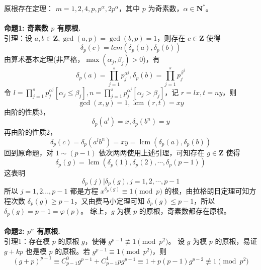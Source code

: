 \documentclass[12pt,a4paper]{article}
\begin{document}
原根存在定理： $m=1,2,4,p,p^\alpha,2p^\alpha$，其中 $p$ 为奇素数，$\alpha\in\mathbf{N^*}$。\\\\
\textbf{命题1: 奇素数 $p$ 有原根.}
\\引理：设 $a, b\in\mathbf{Z},\gcd(a,p)=\gcd(b,p)=1$，则存在 $c\in\mathbf{Z}$ 使得 \begin{equation*}
	\delta_p(c)=lcm(\delta_p(a),\delta_p(b))
\end{equation*}
由算术基本定理(非严格，$\max(\alpha_j,\beta_j)>0$)，有 
\begin{equation*}
	\displaystyle \delta_p(a)=\prod_{j=1}^{s}p_j^{\alpha^{j}},\delta_p(b)=\prod_{j=1}^{s}p_j^{\beta^{j}}
\end{equation*}
令 $\displaystyle l=\prod_{j=1}^{s}p_j^{\alpha^{j}}[\alpha_j\le\beta_j],n=\prod_{j=1}^{s}p_j^{\alpha^{j}}[\alpha_j>\beta_j]$，记 $r=lx,t=ny$，则 \begin{equation*}
	\gcd(x,y)=1,\operatorname{lcm}(r,t)=xy
\end{equation*}
由阶的性质3，\begin{equation*}
	\displaystyle\delta_p(a^l)=x,\delta_p(b^n)=y
\end{equation*}
再由阶的性质2，
\begin{equation*}
	\displaystyle\delta_p(c)=\delta_p(a^lb^n)=xy=\operatorname{lcm}(\delta_p(a),\delta_p(b))
\end{equation*}
回到原命题，对 $1\sim(p-1)$ 依次两两使用上述引理，可知存在 $g\in\mathbf{Z}$ 使得 
\begin{equation*}
	\delta_p(g)=\operatorname{lcm}\left(\delta_p(1),\delta_p(2),\cdots,\delta_p(p-1)\right)
\end{equation*}
这表明 
\begin{equation*}\delta_p(j)|\delta_p(g),j=1,2,\cdots,p-1\end{equation*}
所以 $j=1,2...,p-1$ 都是方程 $x^{\delta_p(g)}\equiv1\pmod p$ 的根，由拉格朗日定理可知方程次数 $\delta_p(g)\ge p-1$，又由费马小定理可知 $\delta_p(g)\le p-1$，所以 $\delta_p(g)=p-1=\varphi(p)$。
综上，$g$ 为模 $p$ 的原根，奇素数都存在原根。
\\
\\
\textbf{命题2: $p^{\alpha}$ 有原根.}\\
引理1：存在模 $p$ 的原根 $g$，使得 $g^{p-1}\not\equiv1\pmod{p^2}$。
设 $g$ 为模 $p$ 的原根，易证 $g+kp$ 也是模 $p$ 的原根。若 $g^{p-1}\equiv1\pmod{p^2}$，则 
\begin{equation*}
	(g+p)^{p-1}\equiv C^0_{p-1}g^{p-1}+C^1_{p-1}pg^{p-1}\equiv1+p(p-1)g^{p-2}\not\equiv1\pmod{p^2}
\end{equation*}
\end{document}
